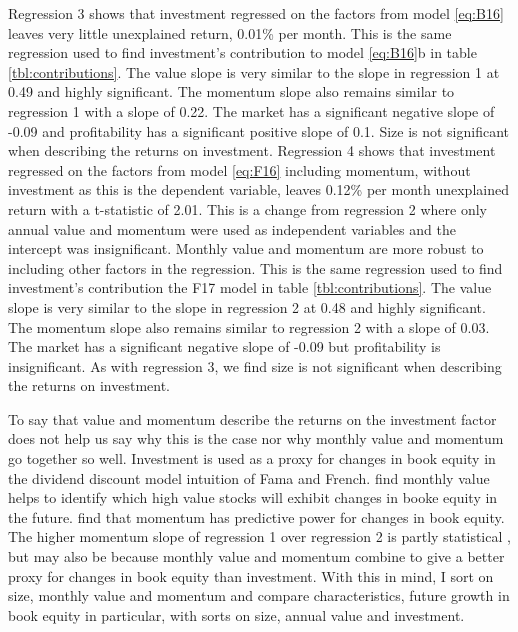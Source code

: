 Regression 3 shows that investment regressed on the factors from
model \ref{eq:B16}
leaves very little unexplained return, 0.01\% per month.
This is the same regression used to find investment's contribution to
model \ref{eq:B16}b in table \ref{tbl:contributions}.
The value slope is very similar to the slope in regression 1 at 0.49 and highly
significant.
The momentum slope also remains similar to regression 1 with a slope of 0.22.
The market has a significant negative slope of -0.09 and
profitability has a significant positive slope of 0.1.
Size is not significant when describing the returns on investment.
Regression 4 shows that investment regressed on the factors from
model \ref{eq:F16} including momentum,
without investment as this is the dependent variable,
leaves 0.12\% per month unexplained return with a t-statistic of 2.01.
This is a change from regression 2 where only annual value and momentum were
used as independent variables and the intercept was insignificant.
Monthly value and momentum are more robust to including other factors in the
regression.
This is the same regression used to find investment's contribution the F17
model in table \ref{tbl:contributions}.
The value slope is very similar to the slope in regression 2 at 0.48 and highly
significant.
The momentum slope also remains similar to regression 2 with a slope of 0.03.
The market has a significant negative slope of -0.09 but
profitability is insignificant.
As with regression 3, we find size is not significant when describing the
returns on investment.

To say that value and momentum describe the returns on the investment factor
does not help us say why this is the case nor why monthly value and momentum
go together so well.
Investment is used as a proxy for changes in book equity in the dividend
discount model intuition of Fama and French.
\textcite{kok2017facts} find monthly value helps to identify which high value
stocks will exhibit changes in booke equity in the future.
\textcite{asness2013devil} find that momentum has predictive power for changes
in book equity.
The higher momentum slope of regression 1 over regression 2 is partly
statistical \parencite{fama2015incremental}, but may also be because monthly
value and momentum combine to give a better proxy for changes in book equity
than investment.
With this in mind, I sort on size, monthly value and momentum and compare
characteristics, future growth in book equity in particular, with sorts on
size, annual value and investment.

